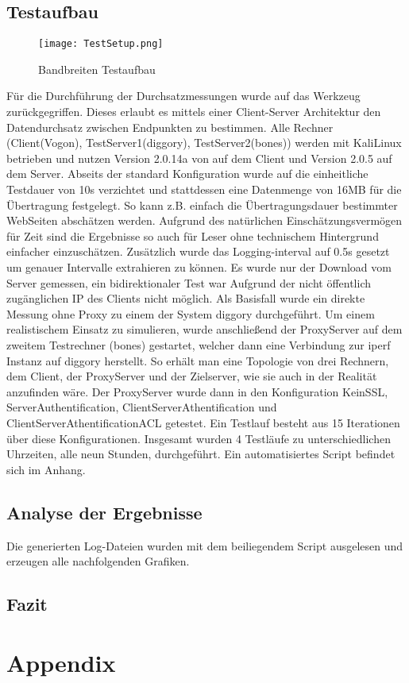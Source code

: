 \documentclass[12pt, a4paper]{scrartcl}
\begin{document}
\subsection{Testaufbau}
\begin{figure}
    \centering
    \texttt{[image: TestSetup.png]}
    \caption{Bandbreiten Testaufbau}
    \label{fig::test}
\end{figure}
Für die Durchführung der Durchsatzmessungen wurde auf das Werkzeug  zurückgegriffen. Dieses erlaubt es mittels einer Client-Server Architektur den Datendurchsatz zwischen Endpunkten zu bestimmen.\newline
Alle Rechner (Client(Vogon), TestServer1(diggory), TestServer2(bones)) werden mit KaliLinux betrieben und nutzen Version 2.0.14a von  auf dem Client und Version 2.0.5 auf dem Server. Abseits der standard Konfiguration wurde auf die einheitliche Testdauer von 10s verzichtet und stattdessen eine Datenmenge von 16MB für die Übertragung festgelegt. So kann z.B. einfach die Übertragungsdauer bestimmter WebSeiten abschätzen werden. Aufgrund des natürlichen Einschätzungsvermögen für Zeit sind die Ergebnisse so auch für Leser ohne technischem Hintergrund einfacher einzuschätzen. Zusätzlich wurde das Logging-interval auf 0.5s gesetzt um genauer Intervalle extrahieren zu können. Es wurde nur der Download vom Server gemessen, ein bidirektionaler Test war Aufgrund der nicht öffentlich zugänglichen IP des Clients nicht möglich.\newline
Als Basisfall wurde ein direkte Messung ohne Proxy zu einem der System diggory durchgeführt. Um einem realistischem Einsatz zu simulieren, wurde anschließend der ProxyServer auf dem zweitem Testrechner (bones) gestartet, welcher dann eine Verbindung zur iperf Instanz auf diggory herstellt. So erhält man eine Topologie von drei Rechnern, dem Client, der ProxyServer und der Zielserver, wie sie auch in der Realität anzufinden wäre.\newline
Der ProxyServer wurde dann in den Konfiguration KeinSSL, ServerAuthentification, ClientServerAthentification und ClientServerAthentificationACL getestet. Ein Testlauf besteht aus 15 Iterationen über diese Konfigurationen. Insgesamt wurden 4 Testläufe zu unterschiedlichen Uhrzeiten, alle neun Stunden, durchgeführt. Ein automatisiertes Script befindet sich im Anhang.
\subsection{Analyse der Ergebnisse}
Die generierten Log-Dateien wurden mit dem beiliegendem Script ausgelesen und erzeugen alle nachfolgenden Grafiken.
\subsection{Fazit}

\newpage
\renewcommand{\thesubsection}{\Alph{subsection}}
\setcounter{page}{\value{lastroman}}
\section*{Appendix}


\end{document}
